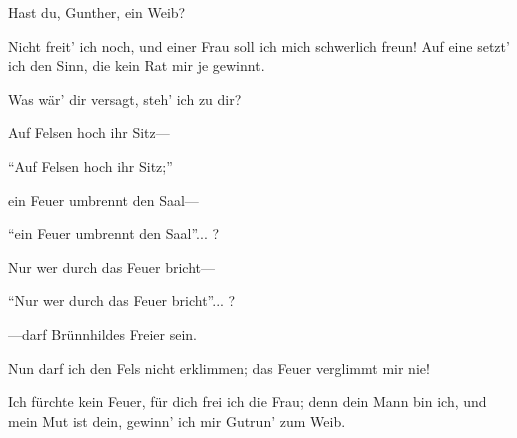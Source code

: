 \begin{drama}
\Siegfriedspeaks



Hast du, Gunther, ein Weib?
 

\Guntherspeaks

Nicht freit' ich noch,
und einer Frau soll ich mich schwerlich freun!
Auf eine setzt' ich den Sinn,
die kein Rat mir je gewinnt.
 

\Siegfriedspeaks



Was wär' dir versagt, steh' ich zu dir?
 

\Guntherspeaks

Auf Felsen hoch ihr Sitz---
 

\Siegfriedspeaks



``Auf Felsen hoch ihr Sitz;''
 

\Guntherspeaks

ein Feuer umbrennt den Saal---
 

\Siegfriedspeaks

``ein Feuer umbrennt den Saal''... ?
 

\Guntherspeaks

Nur wer durch das Feuer bricht---
 

\Siegfriedspeaks



``Nur wer durch das Feuer bricht''... ?
 

\Guntherspeaks

---darf Brünnhildes Freier sein.
 




\Guntherspeaks

Nun darf ich den Fels nicht erklimmen;
das Feuer verglimmt mir nie!
 

\Siegfriedspeaks



Ich fürchte kein Feuer,
für dich frei ich die Frau;
denn dein Mann bin ich,
und mein Mut ist dein,
gewinn' ich mir Gutrun' zum Weib.
 


\end{drama}

